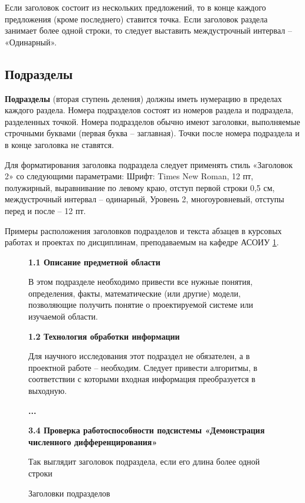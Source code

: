 Если заголовок состоит из нескольких предложений, то в конце каждого предложения
(кроме последнего) ставится точка. Если заголовок раздела занимает более одной строки, то
следует выставить междустрочный интервал – «Одинарный».

\subsection{Подразделы}

{\bf Подразделы} (вторая ступень деления) должны иметь нумерацию в пределах каждого
раздела. Номера подразделов состоят из номеров раздела и подраздела, разделенных точкой.
Номера подразделов обычно имеют заголовки, выполняемые строчными буквами (первая
буква – заглавная). Точки после номера подраздела и в конце заголовка не ставятся.

Для форматирования заголовка подраздела следует применять стиль «Заголовок 2» со
следующими параметрами: Шрифт: Times New Roman, 12 пт, полужирный, выравнивание по
левому краю, отступ первой строки 0,5 см, междустрочный интервал – одинарный, Уровень 2,
многоуровневый, отступы перед и после – 12 пт.

Примеры расположения заголовков подразделов и текста абзацев в курсовых работах и
проектах по дисциплинам, преподаваемым на кафедре АСОИУ \ref{subsects}.

\begin{figure}[h]
	\newcommand\ttt[1]{
		\vspace{6pt}
		\noindent
		\hspace* {.75cm}
		{\raggedright\bf #1}
		\vskip 6pt
	}
	\begin{framed}
		\setlength{\parindent}{1.25cm}
		\linespread{1.5}
		\ttt{1.1 Описание предметной области}
		В этом подразделе необходимо привести все нужные понятия, определения, факты,
		математические (или другие) модели, позволяющие получить понятие о проектируемой
		системе или изучаемой области.
		
		\ttt{1.2 Технология обработки информации}
		Для научного исследования этот подраздел не обязателен, а в проектной работе –
		необходим. Следует привести алгоритмы, в соответствии с которыми входная информация
		преобразуется в выходную.
		
		\ttt{...}
		
		\ttt{3.4 Проверка работоспособности подсистемы «Демонстрация численного дифференцирования»}
		Так выглядит заголовок подраздела, если его длина более одной строки
	\end{framed}
	\caption{Заголовки подразделов}
	\label{subsects}
\end{figure}

